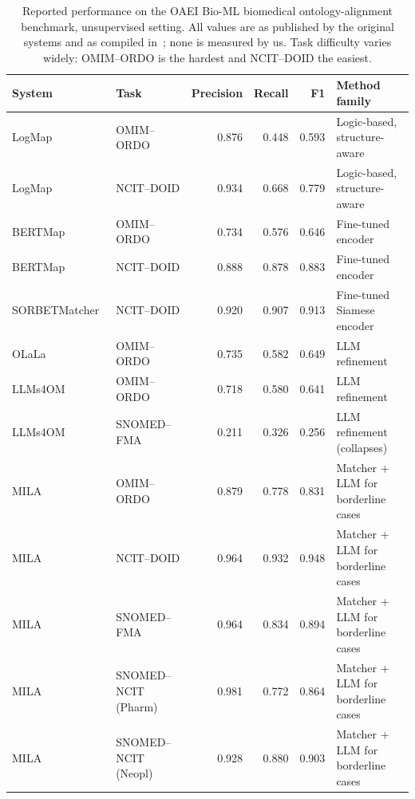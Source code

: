 \documentclass[conference]{IEEEtran}
\begin{document}
\begin{table}[t]
\caption{Reported performance on the OAEI Bio-ML biomedical ontology-alignment benchmark, unsupervised setting. All values are as published by the original systems and as compiled in~\cite{b54}; none is measured by us. Task difficulty varies widely: OMIM--ORDO is the hardest and NCIT--DOID the easiest.}
\label{tab:oaei}
\centering
\footnotesize
\begin{tabular}{@{}llrrrl@{}}
\toprule
\textbf{System} & \textbf{Task} & \textbf{Precision} & \textbf{Recall} & \textbf{F1} & \textbf{Method family} \\
\midrule
LogMap~\cite{b59}         & OMIM--ORDO            & 0.876 & 0.448 & 0.593 & Logic-based, structure-aware \\
LogMap~\cite{b59}         & NCIT--DOID            & 0.934 & 0.668 & 0.779 & Logic-based, structure-aware \\
BERTMap~\cite{b58}        & OMIM--ORDO            & 0.734 & 0.576 & 0.646 & Fine-tuned encoder \\
BERTMap~\cite{b58}        & NCIT--DOID            & 0.888 & 0.878 & 0.883 & Fine-tuned encoder \\
SORBETMatcher~\cite{b61}  & NCIT--DOID            & 0.920 & 0.907 & 0.913 & Fine-tuned Siamese encoder \\
OLaLa~\cite{b57}          & OMIM--ORDO            & 0.735 & 0.582 & 0.649 & LLM refinement \\
LLMs4OM~\cite{b56}        & OMIM--ORDO            & 0.718 & 0.580 & 0.641 & LLM refinement \\
LLMs4OM~\cite{b56}        & SNOMED--FMA           & 0.211 & 0.326 & 0.256 & LLM refinement (collapses) \\
\midrule
MILA~\cite{b54}           & OMIM--ORDO            & 0.879 & 0.778 & 0.831 & Matcher + LLM for borderline cases \\
MILA~\cite{b54}           & NCIT--DOID            & 0.964 & 0.932 & 0.948 & Matcher + LLM for borderline cases \\
MILA~\cite{b54}           & SNOMED--FMA           & 0.964 & 0.834 & 0.894 & Matcher + LLM for borderline cases \\
MILA~\cite{b54}           & SNOMED--NCIT (Pharm)  & 0.981 & 0.772 & 0.864 & Matcher + LLM for borderline cases \\
MILA~\cite{b54}           & SNOMED--NCIT (Neopl)  & 0.928 & 0.880 & 0.903 & Matcher + LLM for borderline cases \\
\bottomrule
\end{tabular}
\end{table}
\end{document}
